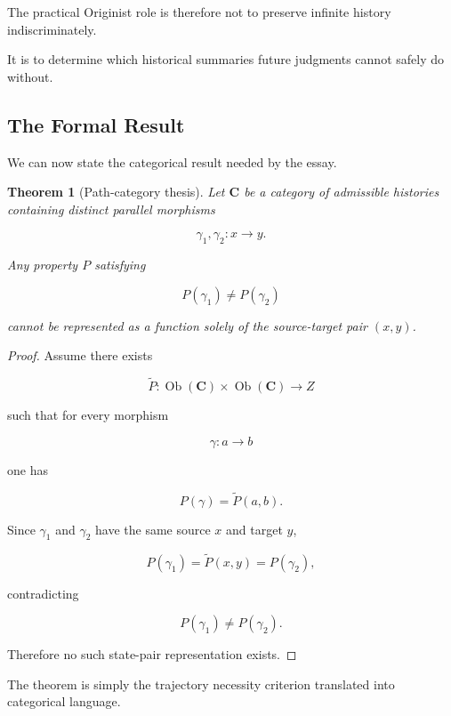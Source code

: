 \documentclass[
  11pt,
  a4paper,
  DIV=12,
  BCOR=0mm,
  parskip=half-
]{scrartcl}
\newcommand{\Ob}{\operatorname{Ob}}
\theoremstyle{definition}
\theoremstyle{plain}
\newtheorem{theorem}[definition]{Theorem}
\theoremstyle{remark}
\begin{document}
The practical Originist role is therefore not to preserve infinite history
indiscriminately.

It is to determine which historical summaries future judgments cannot safely
do without.


\subsection{The Formal Result}
\label{app:path-category-thesis}

We can now state the categorical result needed by the essay.

\begin{theorem}[Path-category thesis]
\label{thm:path-category-thesis}
Let \(\mathbf C\) be a category of admissible histories containing distinct
parallel morphisms

\[
  \gamma_1,\gamma_2:x\to y.
\]

Any property \(P\) satisfying

\[
  P(\gamma_1)\neq P(\gamma_2)
\]

cannot be represented as a function solely of the source-target pair
\((x,y)\).
\end{theorem}

\begin{proof}
Assume there exists

\[
  \widetilde P:
  \Ob(\mathbf C)\times\Ob(\mathbf C)
  \to Z
\]

such that for every morphism

\[
  \gamma:a\to b
\]

one has

\[
  P(\gamma)=\widetilde P(a,b).
\]

Since \(\gamma_1\) and \(\gamma_2\) have the same source \(x\) and target \(y\),

\[
  P(\gamma_1)
  =
  \widetilde P(x,y)
  =
  P(\gamma_2),
\]

contradicting

\[
  P(\gamma_1)\neq P(\gamma_2).
\]

Therefore no such state-pair representation exists.
\end{proof}

The theorem is simply the trajectory necessity criterion translated into
categorical language.
\end{document}
